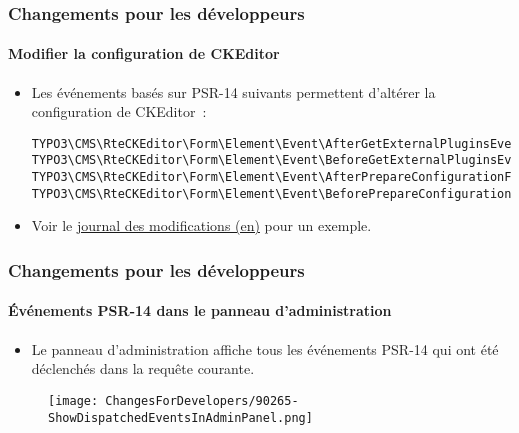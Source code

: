 
\begin{frame}[fragile]
	\frametitle{Changements pour les développeurs}
	\framesubtitle{Modifier la configuration de CKEditor}

	\lstset{basicstyle=\tiny\ttfamily}

	\begin{itemize}
		\item Les événements basés sur PSR-14 suivants permettent d'altérer la configuration de CKEditor~:

\vspace{-0.4cm}
\begin{lstlisting}
TYPO3\CMS\RteCKEditor\Form\Element\Event\AfterGetExternalPluginsEvent
TYPO3\CMS\RteCKEditor\Form\Element\Event\BeforeGetExternalPluginsEvent
TYPO3\CMS\RteCKEditor\Form\Element\Event\AfterPrepareConfigurationForEditorEvent
TYPO3\CMS\RteCKEditor\Form\Element\Event\BeforePrepareConfigurationForEditorEvent
\end{lstlisting}

		\item Voir le
			\href{https://docs.typo3.org/c/typo3/cms-core/master/en-us/Changelog/10.3/Feature-88818-IntroduceEventsToModifyCKEditorConfiguration.html}{journal des modifications (en)}
			pour un exemple.
	\end{itemize}

\end{frame}


\begin{frame}[fragile]
	\frametitle{Changements pour les développeurs}
	\framesubtitle{Événements PSR-14 dans le panneau d'administration}

	\begin{itemize}
		\item Le panneau d'administration affiche tous les événements PSR-14
			qui ont été déclenchés dans la requête courante.
	\end{itemize}

	\begin{figure}
		\texttt{[image: ChangesForDevelopers/90265-ShowDispatchedEventsInAdminPanel.png]}
	\end{figure}

\end{frame}

